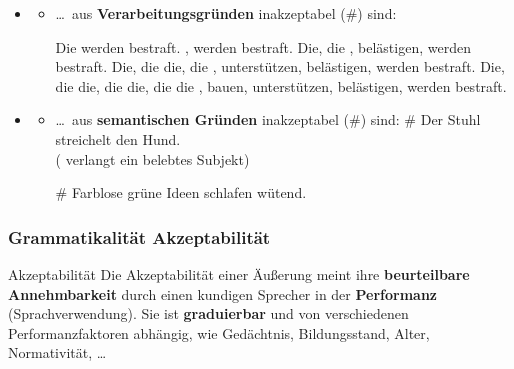 \begin{frame}

\begin{itemize}
	\item[]
	
	\begin{itemize}
	\item \dots\ aus \textbf{Verarbeitungsgründen} inakzeptabel (\#) sind:
		
\pause
		\ex Die werden bestraft.
		\ex {}, werden bestraft.
		\ex Die, die , belästigen, werden bestraft.
		\ex Die, die die, die , unterstützen, belästigen, werden bestraft.
		\ex Die, die die, die die, die die , bauen, unterstützen, belästigen, werden bestraft.
		\z
\end{itemize}

\end{itemize}
\nocite{Fries15a, Repp&Co15a}
\end{frame}


\begin{frame}

\begin{itemize}
	\item[]
	
	\begin{itemize}
		
		\item \dots\ aus \textbf{semantischen Gründen} inakzeptabel (\#) sind:
		\ea \# Der Stuhl streichelt den Hund.\\
		( verlangt ein belebtes Subjekt)
		\z
		
		\ea \# Farblose grüne Ideen schlafen wütend. \hfill 
		\citep{Chomsky57x}
		\z
		
	\end{itemize}

\end{itemize}
\nocite{Coseriu88a, Fries15a, Repp&Co15a}
\end{frame}


\begin{frame}
\frametitle{Grammatikalität \vs Akzeptabilität}

\begin{block}{Akzeptabilität}
Die Akzeptabilität einer Äußerung meint ihre \textbf{beurteilbare Annehmbarkeit} durch einen kundigen Sprecher in der \textbf{Performanz} (Sprachverwendung). Sie ist \textbf{graduierbar} und von verschiedenen Performanzfaktoren abhängig, wie \zB Gedächtnis, Bildungsstand, Alter, Normativität, \dots\ \citep[vgl.][]{Fries&MyP16b}

\end{block}

\end{frame}


